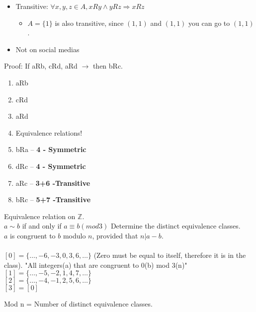 \documentclass[english,10pt,a4paper]{article}
\begin{document}
\begin{theo}[Transitive] 
\begin{itemize}
\item Transitive: $\forall x,y,z \in A, xRy \wedge yRz \Rightarrow xRz$
\begin{itemize}
\item $A=\{1\}$ is also transitive, since $(1,1)$ and $(1,1)$ you can go to $(1,1)$.
\end{itemize}
\item Not on social medias
\end{itemize}
\end{theo}


\begin{theo}[Pitchbox] 
Proof: If aRb, cRd, aRd $\rightarrow$ then bRc.
\begin{enumerate}
\item aRb
\item cRd
\item aRd
\item Equivalence relations!
\item bRa -- \textbf{4 - Symmetric}
\item dRc -- \textbf{4 - Symmetric}
\item aRc -- \textbf{3+6 -Transitive}
\item bRc -- \textbf{5+7 -Transitive}
\end{enumerate}
\end{theo}



\begin{theo} 
Equivalence relation on $\mathbb{Z}$.\\
$a\sim b$ if and only if $a \equiv b(mod 3)$
Determine	the	distinct	equivalence	classes.
\\
$a$ is congruent to $b$ modulo $n$, provided that $n|a-b$.\\
\\
$[0] = \{ \ldots, -6, -3, 0, 3, 6, \ldots\}$ (Zero must be equal to itself, therefore it is in the class). "All integers(a) that are congruent to 0(b) mod 3(n)" \\
$[1] = \{ \ldots, -5, -2, 1, 4, 7, \ldots\}$\\
$[2] = \{ \ldots, -4, -1, 2, 5, 6, \ldots\}$\\
$[3] = [0]$

Mod n = Number of distinct equivalence classes.
\end{theo}
\end{document}
